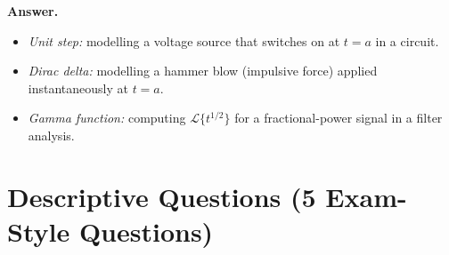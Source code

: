 \documentclass[12pt,a4paper]{article}
\begin{document}
\begin{enumerate}
\textbf{Answer.}
\begin{itemize}
  \item \textit{Unit step:} modelling a voltage source that switches on at
        $t = a$ in a circuit.
  \item \textit{Dirac delta:} modelling a hammer blow (impulsive force) applied
        instantaneously at $t = a$.
  \item \textit{Gamma function:} computing $\mathcal{L}\{t^{1/2}\}$ for a
        fractional-power signal in a filter analysis.
\end{itemize}

\end{enumerate}

\section{Descriptive Questions (5 Exam-Style Questions)}
\end{document}
